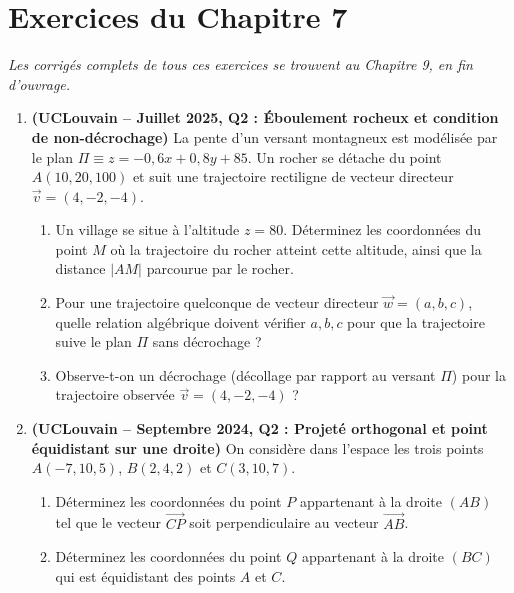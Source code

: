 \section{Exercices du Chapitre 7}

\emph{Les corrigés complets de tous ces exercices se trouvent au Chapitre 9, en fin d'ouvrage.}

\begin{enumerate}[label=\textbf{Exercice 7.\arabic* --}, align=left, leftmargin=*]

    \item \textbf{(UCLouvain -- Juillet 2025, Q2 : Éboulement rocheux et condition de non-décrochage)}
    La pente d'un versant montagneux est modélisée par le plan $\Pi \equiv z = -0,6x + 0,8y + 85$. Un rocher se détache du point $A(10, 20, 100)$ et suit une trajectoire rectiligne de vecteur directeur $\vec{v} = (4, -2, -4)$.
    \begin{enumerate}[label=(\alph*)]
        \item Un village se situe à l'altitude $z = 80$. Déterminez les coordonnées du point $M$ où la trajectoire du rocher atteint cette altitude, ainsi que la distance $|AM|$ parcourue par le rocher.
        \item Pour une trajectoire quelconque de vecteur directeur $\vec{w} = (a, b, c)$, quelle relation algébrique doivent vérifier $a, b, c$ pour que la trajectoire suive le plan $\Pi$ sans décrochage ?
        \item Observe-t-on un décrochage (décollage par rapport au versant $\Pi$) pour la trajectoire observée $\vec{v} = (4, -2, -4)$ ?
    \end{enumerate}

    \item \textbf{(UCLouvain -- Septembre 2024, Q2 : Projeté orthogonal et point équidistant sur une droite)}
    On considère dans l'espace les trois points $A(-7, 10, 5)$, $B(2, 4, 2)$ et $C(3, 10, 7)$.
    \begin{enumerate}[label=(\alph*)]
        \item Déterminez les coordonnées du point $P$ appartenant à la droite $(AB)$ tel que le vecteur $\overrightarrow{CP}$ soit perpendiculaire au vecteur $\overrightarrow{AB}$.
        \item Déterminez les coordonnées du point $Q$ appartenant à la droite $(BC)$ qui est équidistant des points $A$ et $C$.
    \end{enumerate}


\end{enumerate}
